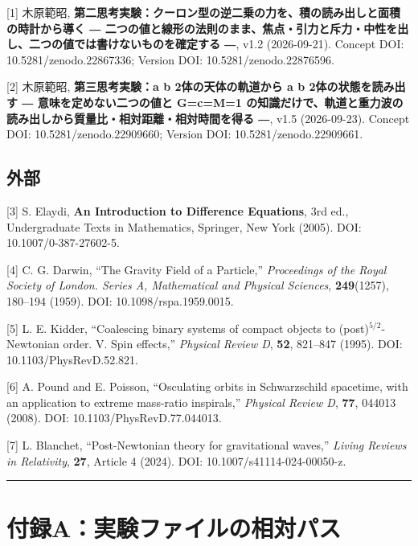 \documentclass[
  a4paper,
]{ltjsarticle}
\begin{document}
{[}1{]} 木原範昭,
\textbf{第二思考実験：クーロン型の逆二乗の力を、積の読み出しと面積の時計から導く
―
二つの値と線形の法則のまま、焦点・引力と斥力・中性を出し、二つの値では書けないものを確定する
―}, v1.2 (2026-09-21). Concept DOI: 10.5281/zenodo.22867336; Version
DOI: 10.5281/zenodo.22876596.

{[}2{]} 木原範昭, \textbf{第三思考実験：a b 2体の天体の軌道から a b
2体の状態を読み出す ― 意味を定めない二つの値と G=c=M=1
の知識だけで、軌道と重力波の読み出しから質量比・相対距離・相対時間を得る
―}, v1.5 (2026-09-23). Concept DOI: 10.5281/zenodo.22909660; Version
DOI: 10.5281/zenodo.22909661.

\subsection{外部}\label{ux5916ux90e8}

{[}3{]} S. Elaydi, \textbf{An Introduction to Difference Equations}, 3rd
ed., Undergraduate Texts in Mathematics, Springer, New York (2005). DOI:
10.1007/0-387-27602-5.

{[}4{]} C. G. Darwin, ``The Gravity Field of a Particle,''
\emph{Proceedings of the Royal Society of London. Series A, Mathematical
and Physical Sciences}, \textbf{249}(1257), 180--194 (1959). DOI:
10.1098/rspa.1959.0015.

{[}5{]} L. E. Kidder, ``Coalescing binary systems of compact objects to
(post)\(^{5/2}\)-Newtonian order. V. Spin effects,'' \emph{Physical
Review D}, \textbf{52}, 821--847 (1995). DOI: 10.1103/PhysRevD.52.821.

{[}6{]} A. Pound and E. Poisson, ``Osculating orbits in Schwarzschild
spacetime, with an application to extreme mass-ratio inspirals,''
\emph{Physical Review D}, \textbf{77}, 044013 (2008). DOI:
10.1103/PhysRevD.77.044013.

{[}7{]} L. Blanchet, ``Post-Newtonian theory for gravitational waves,''
\emph{Living Reviews in Relativity}, \textbf{27}, Article 4 (2024). DOI:
10.1007/s41114-024-00050-z.

\begin{center}\rule{0.5\linewidth}{0.5pt}\end{center}

\section{付録A：実験ファイルの相対パス}\label{ux4ed8ux9332aux5b9fux9a13ux30d5ux30a1ux30a4ux30ebux306eux76f8ux5bfeux30d1ux30b9}
\end{document}
